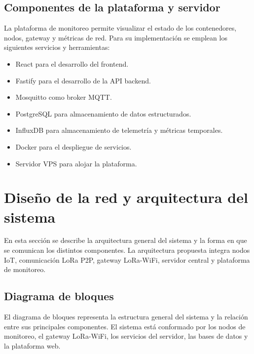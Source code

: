\endgroup

\subsection{Componentes de la plataforma y servidor}

La plataforma de monitoreo permite visualizar el estado de los contenedores, nodos, gateway y métricas de red. Para su implementación se emplean los siguientes servicios y herramientas:

\begin{itemize}
    \item React para el desarrollo del frontend.
    \item Fastify para el desarrollo de la API backend.
    \item Mosquitto como broker MQTT.
    \item PostgreSQL para almacenamiento de datos estructurados.
    \item InfluxDB para almacenamiento de telemetría y métricas temporales.
    \item Docker para el despliegue de servicios.
    \item Servidor VPS para alojar la plataforma.
\end{itemize}

\section{Diseño de la red y arquitectura del sistema}

En esta sección se describe la arquitectura general del sistema y la forma en que se comunican los distintos componentes. La arquitectura propuesta integra nodos IoT, comunicación LoRa P2P, gateway LoRa-WiFi, servidor central y plataforma de monitoreo.

\subsection{Diagrama de bloques}

El diagrama de bloques representa la estructura general del sistema y la relación entre sus principales componentes. El sistema está conformado por los nodos de monitoreo, el gateway LoRa-WiFi, los servicios del servidor, las bases de datos y la plataforma web.

